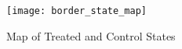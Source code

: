 \begin{figure}[H]
    \centering
    \texttt{[image: border\_state\_map]}
    \caption{Map of Treated and Control States}
    \label{fig:border-state-map}
\end{figure}